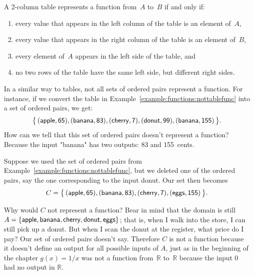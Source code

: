\begin{rem}
A 2-column table represents a function from~$A$ to~$B$ if and only if:
\begin{enumerate}
\item every value that appears in the left column of the table is an element of~$A$,
\item every value that appears in the right column of the table is an element of~$B$,
\item every element of~$A$ appears in the left side of the table,
and
\item no two rows of the table have the same left side, but different right sides.
\end{enumerate}
\end{rem}

\noindent
In a similar way to tables, not all sets of ordered pairs represent a function.  For instance, if we convert the table in Example~\ref{example:functions:nottablefunc} into a set of ordered pairs, we get:
$$ \bigl\{\, (\sf{apple}, 65), 
 (\sf{banana}, 83), 
 (\sf{cherry}, 7),
  (\sf{donut}, 99), 
  (\sf{banana}, 155) \,\bigr\} .$$
How can we tell that this set of ordered pairs doesn't represent a function?  Because the input "banana" has two outputs:  83 and 155~cents.  

Suppose  we used the set of ordered pairs from Example~\ref{example:functions:nottablefunc}, but we deleted one of the ordered pairs, say the one corresponding to the input donut.  Our set then becomes
 $$ C = \bigl\{\, (\sf{apple}, 65), 
 (\sf{banana}, 83), 
 (\sf{cherry}, 7),
  (\sf{eggs}, 155) \,\bigr\} .$$

Why would $C$ not represent a function?  Bear in mind that the domain is still $A = \{  \sf{apple} , \sf{banana} , \sf{cherry} , \sf{donut} , \sf{eggs} \}$; that is, when I walk into the store, I can still pick up a donut.  But when I scan the donut at the register, what price do I pay?  Our set of ordered pairs doesn't say.  Therefore $C$ is not a function because it doesn't define an output for all possible inputs of $A$, just as in the beginning of the chapter $g(x) = 1/x$ was not a function from~$\mathbb{R}$ to~$\mathbb{R}$ because the input 0 had no output in $\mathbb{R}$.  

